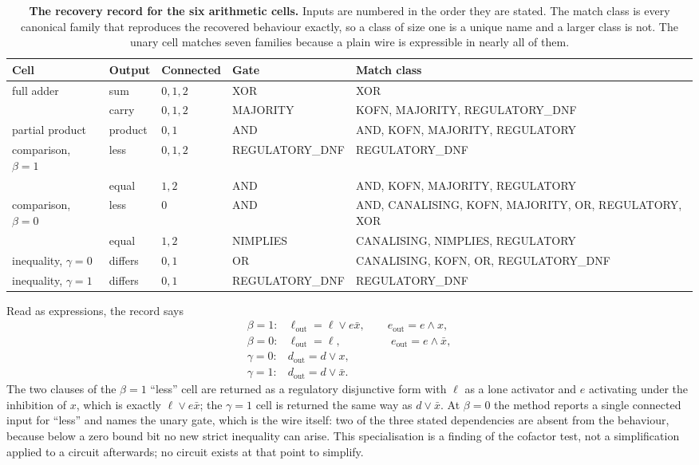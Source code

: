 \documentclass[11pt,a4paper]{article}
\begin{document}
\begin{table}[htbp]
\centering
\caption{\textbf{The recovery record for the six arithmetic cells.} Inputs are
numbered in the order they are stated. The match class is every canonical
family that reproduces the recovered behaviour exactly, so a class of size one
is a unique name and a larger class is not. The unary cell matches seven
families because a plain wire is expressible in nearly all of
them.}\label{tab:cellrecord}
\small
\begin{tabularx}{\linewidth}{llll>{\raggedright\arraybackslash}X}
\toprule
Cell & Output & Connected & Gate & Match class\\\midrule
full adder & sum & $0,1,2$ & XOR & XOR\\
 & carry & $0,1,2$ & MAJORITY & KOFN, MAJORITY, REGULATORY\_DNF\\
partial product & product & $0,1$ & AND & AND, KOFN, MAJORITY, REGULATORY\\
comparison, $\beta=1$ & less & $0,1,2$ & REGULATORY\_DNF & REGULATORY\_DNF\\
 & equal & $1,2$ & AND & AND, KOFN, MAJORITY, REGULATORY\\
comparison, $\beta=0$ & less & $0$ & AND & AND, CANALISING, KOFN, MAJORITY, OR,
 REGULATORY, XOR\\
 & equal & $1,2$ & NIMPLIES & CANALISING, NIMPLIES, REGULATORY\\
inequality, $\gamma=0$ & differs & $0,1$ & OR & CANALISING, KOFN, OR,
 REGULATORY\_DNF\\
inequality, $\gamma=1$ & differs & $0,1$ & REGULATORY\_DNF & REGULATORY\_DNF\\
\bottomrule
\end{tabularx}
\end{table}

Read as expressions, the record says
\[
\begin{array}{ll}
 \beta=1:&\ell_{\mathrm{out}}=\ell\vee e\bar x,\qquad e_{\mathrm{out}}=e\wedge x,\\[2pt]
 \beta=0:&\ell_{\mathrm{out}}=\ell,\qquad\qquad\ \ e_{\mathrm{out}}=e\wedge\bar x,\\[4pt]
 \gamma=0:&d_{\mathrm{out}}=d\vee x,\\[2pt]
 \gamma=1:&d_{\mathrm{out}}=d\vee\bar x.
\end{array}
\]
The two clauses of the $\beta=1$ ``less'' cell are returned as a regulatory
disjunctive form with $\ell$ as a lone activator and $e$ activating under the
inhibition of $x$, which is exactly $\ell\vee e\bar x$; the $\gamma=1$ cell is
returned the same way as $d\vee\bar x$. At $\beta=0$ the method reports a single
connected input for ``less'' and names the unary gate, which is the wire itself:
two of the three stated dependencies are absent from the behaviour, because
below a zero bound bit no new strict inequality can arise. This specialisation
is a finding of the cofactor test, not a simplification applied to a circuit
afterwards; no circuit exists at that point to simplify.
\end{document}
